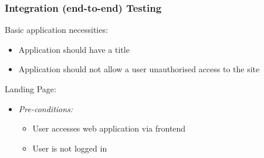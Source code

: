\documentclass{article}
\begin{document}
		\subsubsection{Integration (end-to-end) Testing}
			Basic application necessities:			
			\begin{itemize}
				\item Application should have a title
				\item Application should not allow a user unauthorised access to the site
			\end{itemize}
			Landing Page:
			\begin{itemize}
			 \item \textit{Pre-conditions:} 
				\begin{itemize}
					\item User accesses web application via frontend
					\item User is not logged in
				\end{itemize}
			\end{itemize}
\end{document}
